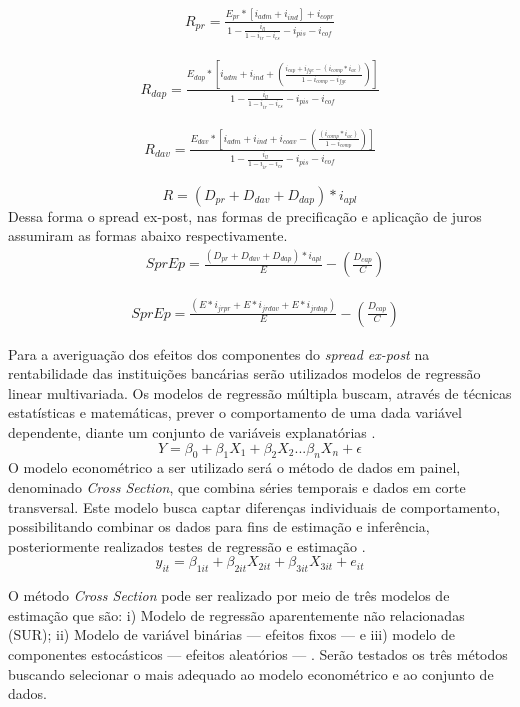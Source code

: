 \documentclass[12pt,12pt,openright,oneside,a4paper,chapter=TITLE,section=TITLE,subsection=TITLE,subsubsection=TITLE,english,french,spanish,portugues,sumario=tradicional]{abntex2}
\begin{document}
\[\begin{aligned}
R_{pr} = \frac{E_{pr} * [i_{adm} + i_{ind}] + i_{copr}}
{1 -  \frac{i_{ll}}{1 - i_{ir} - i_{cs}} - i_{pis} - i_{cof}}
\end{aligned}\]

\[\begin{aligned}
R_{dap} = \frac{E_{dap} * [i_{adm} + i_{ind} + (\frac{i_{cap}+ i_{fgc} - (i_{comp}*i_{ac})}{1 - i_{comp} - i_{fgc}})]}  {1 -  \frac{i_{ll}}{1 - i_{ir} - i_{cs}} - i_{pis} - i_{cof}}
\end{aligned}\]

\[\begin{aligned}
R_{dav} = \frac{E_{dav} * [i_{adm} + i_{ind} + i_{coav} - (\frac{(i_{comp}*i_{ac})}{1 - i_{comp}})]}{1 -  \frac{i_{ll}}{1 - i_{ir} - i_{cs}} - i_{pis} - i_{cof}}
\end{aligned}\]

\[
R = (D_{pr} + D_{dav} + D_{dap}) * i_{apl}
\]
Dessa forma o spread ex-post, nas formas de precificação e aplicação de juros assumiram as formas abaixo respectivamente.
\[\begin{aligned}
& SprEp = \frac{(D_{pr} + D_{dav} + D_{dap})* i_{apl}}{E} - (\frac{D_{cap}}{C})
\end{aligned}\]

\[\begin{aligned}
& SprEp = \frac{(E*i_{jrpr} + E*i_{jrdav} + E*i_{jrdap})}{E} - (\frac{D_{cap}}{C})
\end{aligned}\]

Para a averiguação dos efeitos dos componentes do \emph{spread ex-post} na rentabilidade das instituições bancárias serão utilizados modelos de regressão linear multivariada. Os modelos de regressão múltipla buscam, através de técnicas estatísticas e matemáticas, prever o comportamento de uma dada variável dependente, diante um conjunto de variáveis explanatórias \cite{hill:2010} \cite{gareth:2017}.
\[
Y = \beta_0 + \beta_1X_1 + \beta_2X_2...\beta_nX_n + \epsilon
\]
O modelo econométrico a ser utilizado será o método de dados em painel, denominado \emph{Cross Section}, que combina séries temporais e dados em corte transversal. Este modelo busca captar diferenças individuais de comportamento, possibilitando combinar os dados para fins de estimação e inferência, posteriormente realizados testes de regressão e estimação \cite{hill:2010}.
\[
y_{it} = \beta_{1it} + \beta_{2it}X_{2it} + \beta_{3it}X_{3it} + e_{it}
\]

O método \emph{Cross Section} pode ser realizado por meio de três modelos de estimação que são: i) Modelo de regressão aparentemente não relacionadas (SUR); ii) Modelo de variável binárias --- efeitos fixos --- e iii) modelo de componentes estocásticos --- efeitos aleatórios --- \cite{hill:2010}. Serão testados os três métodos buscando selecionar o mais adequado ao modelo econométrico e ao conjunto de dados.
\end{document}
